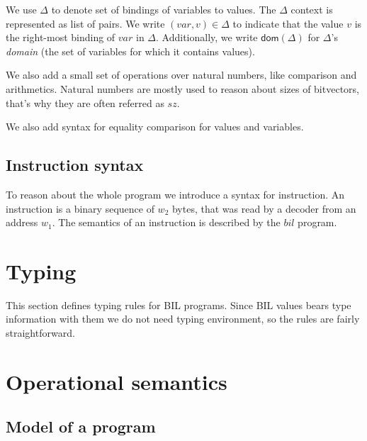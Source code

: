 \documentclass[11pt]{article}
\begin{document}
We use $\Delta$ to denote set of bindings of variables to values. The
$\Delta$ context is represented as list of pairs. We write
$(var,v) \in \Delta$ to indicate that the value $v$ is the right-most
binding of $var$ in $\Delta$.  Additionally, we write
$\mathsf{dom}(\Delta)$ for $\Delta$'s {\em domain} (the set of
variables for which it contains values).

We also add a small set of operations over natural numbers, like
comparison and arithmetics. Natural numbers are mostly used to reason
about sizes of bitvectors, that's why they are often referred as
$\mathit{sz}$.

We also add syntax for equality comparison for values and variables.


\ottgrammartabular{
\ottdelta\ottinterrule
}

\ottgrammartabular{
\ottformula\ottinterrule
}

\ottgrammartabular{
\ottnat\ottinterrule
}

\subsection{Instruction syntax}
\label{sec:insn}

To reason about the whole program we introduce a syntax for
instruction. An instruction is a binary sequence of $\mathit{w_2}$
bytes, that was read by a decoder from an address $\mathit{w_1}$. The
semantics of an instruction is described by the $\mathit{bil}$ program.

\ottgrammartabular{
\ottinsn\ottinterrule
}

\clearpage

\section{Typing}
\label{sec:typing}

This section defines typing rules for BIL programs. Since BIL values
bears type information with them we do not need typing environment, so
the rules are fairly straightforward.

\ottdefnstypingXXstmt

\ottdefnstypingXXexp

\clearpage


\section{Operational semantics}

\subsection{Model of a program}
\end{document}
